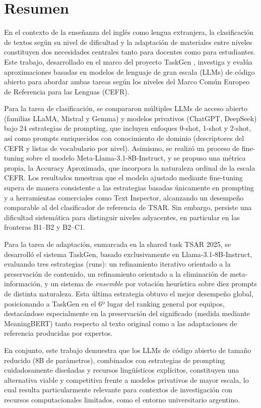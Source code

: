 \section*{Resumen}

En el contexto de la enseñanza del inglés como lengua extranjera, la clasificación de textos según su nivel de dificultad y la adaptación de materiales entre niveles constituyen dos necesidades centrales tanto para docentes como para estudiantes. Este trabajo, desarrollado en el marco del proyecto TaskGen \parencite{Vives2024}, investiga y evalúa aproximaciones basadas en modelos de lenguaje de gran escala (LLMs) de código abierto para abordar ambas tareas según los niveles del Marco Común Europeo de Referencia para las Lenguas (CEFR).

Para la tarea de clasificación, se compararon múltiples LLMs de acceso abierto (familias LLaMA, Mistral y Gemma) y modelos privativos (ChatGPT, DeepSeek) bajo 24 estrategias de prompting, que incluyen enfoques 0-shot, 1-shot y 2-shot, así como prompts enriquecidos con conocimiento de dominio (descriptores del CEFR y listas de vocabulario por nivel). Asimismo, se realizó un proceso de fine-tuning sobre el modelo Meta-Llama-3.1-8B-Instruct, y se propuso una métrica propia, la Accuracy Aproximada, que incorpora la naturaleza ordinal de la escala CEFR. Los resultados muestran que el modelo ajustado mediante fine-tuning supera de manera consistente a las estrategias basadas únicamente en prompting y a herramientas comerciales como Text Inspector, alcanzando un desempeño comparable al del clasificador de referencia de TSAR. Sin embargo, persiste una dificultad sistemática para distinguir niveles adyacentes, en particular en las fronteras B1--B2 y B2--C1.

Para la tarea de adaptación, enmarcada en la shared task TSAR 2025, se desarrolló el sistema TaskGen, basado exclusivamente en Llama-3.1-8B-Instruct, evaluando tres estrategias (runs): un refinamiento iterativo orientado a la preservación de contenido, un refinamiento orientado a la eliminación de meta-información, y un sistema de \textit{ensemble} por votación heurística sobre diez prompts de distinta naturaleza. Esta última estrategia obtuvo el mejor desempeño global, posicionando a TaskGen en el 6º lugar del ranking general por equipos, destacándose especialmente en la preservación del significado (medida mediante MeaningBERT) tanto respecto al texto original como a las adaptaciones de referencia producidas por expertos.

En conjunto, este trabajo demuestra que los LLMs de código abierto de tamaño reducido (8B de parámetros), combinados con estrategias de prompting cuidadosamente diseñadas y recursos lingüísticos explícitos, constituyen una alternativa viable y competitiva frente a modelos privativos de mayor escala, lo cual resulta particularmente relevante para contextos de investigación con recursos computacionales limitados, como el entorno universitario argentino.